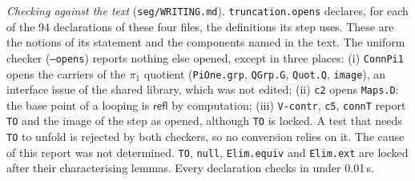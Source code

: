 \documentclass[11pt]{amsart}
\theoremstyle{definition}
\theoremstyle{remark}
\newcommand{\code}[1]{\texttt{#1}}
\begin{document}
\medskip
\noindent\emph{Checking against the text} (\code{seg/WRITING.md}).
\code{truncation.opens} declares, for each of the 94 declarations of
these four files, the definitions its step uses. These are the notions of
its statement and the components named in the text. The uniform checker
(\code{--opens}) reports nothing else opened, except in three places:
(i) \code{ConnPi1} opens the carriers of the $\pi_1$ quotient
(\code{PiOne.grp}, \code{QGrp.G}, \code{Quot.Q}, \code{image}), an interface
issue of the shared library, which was not edited; (ii) \code{c2} opens
\code{Maps.D}: the base point of a looping is $\mathsf{refl}$ by
computation; (iii) \code{V-contr}, \code{c5}, \code{connT} report
\code{TO} and the image of the step as opened, although \code{TO} is
locked. A test that needs \code{TO} to unfold is rejected by both
checkers, so no conversion relies on it. The cause of this report was
not determined. \code{TO}, \code{null}, \code{Elim.equiv} and \code{Elim.ext}
are locked after their characterising lemmas. Every declaration checks
in under 0.01\,s.
\end{document}
